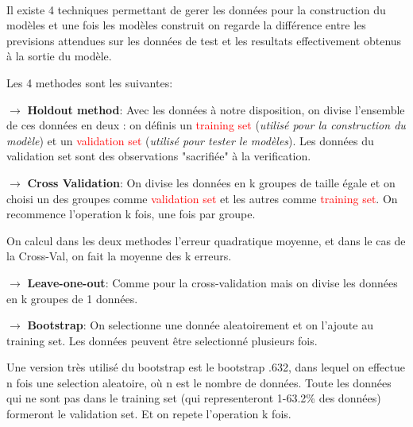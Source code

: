 \documentclass[a4paper, 11pt, onecolumn]{article}
\begin{document}
\begin{enumerate}
  \paragraph{}
Il existe 4 techniques permettant de gerer les données pour la construction du modèles et une fois les modèles construit on regarde la différence entre les previsions attendues sur les données de test et les resultats effectivement obtenus à la sortie du modèle.

Les 4 methodes sont les suivantes:

$\rightarrow$ \textbf{Holdout method}: Avec les données à notre disposition, on divise l'ensemble de ces données en deux : on définis un \textcolor{red}{training set} (\textit{utilisé pour la construction du modèle}) et un \textcolor{red}{validation set} (\textit{utilisé pour tester le modèles}). Les données du validation set sont des observations "sacrifiée" à la verification.

$\rightarrow$ \textbf{Cross Validation}: On divise les données en k groupes de taille égale et on choisi un des groupes comme \textcolor{red}{validation set} et les autres comme \textcolor{red}{training set}. On recommence l'operation k fois, une fois par groupe. 

On calcul dans les deux methodes l'erreur quadratique moyenne, et dans le cas de la Cross-Val, on fait la moyenne des k erreurs.

$\rightarrow$ \textbf{Leave-one-out}: Comme pour la cross-validation mais on divise les données en k groupes de 1 données. 

$\rightarrow$ \textbf{Bootstrap}: On selectionne une donnée aleatoirement et on l'ajoute au training set. Les données peuvent être selectionné plusieurs fois. 

Une version très utilisé du bootstrap est le bootstrap .632, dans lequel on effectue n fois une selection aleatoire,  où n est le nombre de données.
Toute les données qui ne sont pas dans le training set (qui representeront 1-63.2\% des données) formeront le validation set.
Et on repete l'operation k fois.

\end{enumerate}
\end{document}
